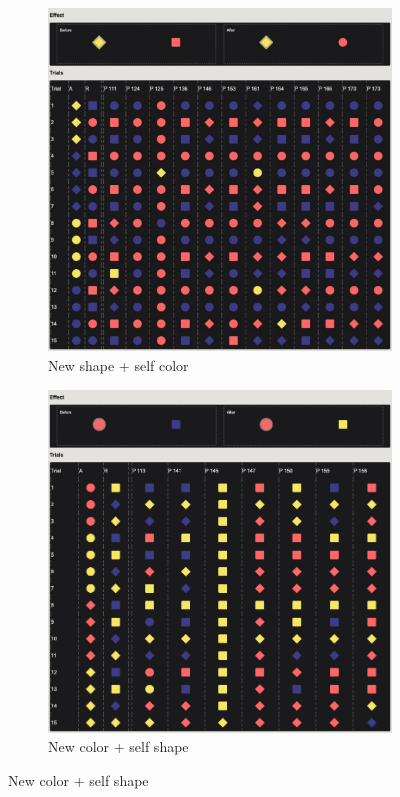 \documentclass{article}
\begin{document}
\begin{figure}[h!]
  \begin{subfigure}[t]{0.32\textwidth}
  	\centering
  	\includegraphics[width=\linewidth]{rev_02} 
  	\caption{New shape + self color} \label{fig:learn02}
  \end{subfigure}
  \begin{subfigure}[t]{0.32\textwidth}
  	\centering
  	\includegraphics[width=\linewidth]{rev_04} 
  	\caption{New color + self shape} \label{fig:learn04}
  \end{subfigure}


\end{figure}
\end{document}
